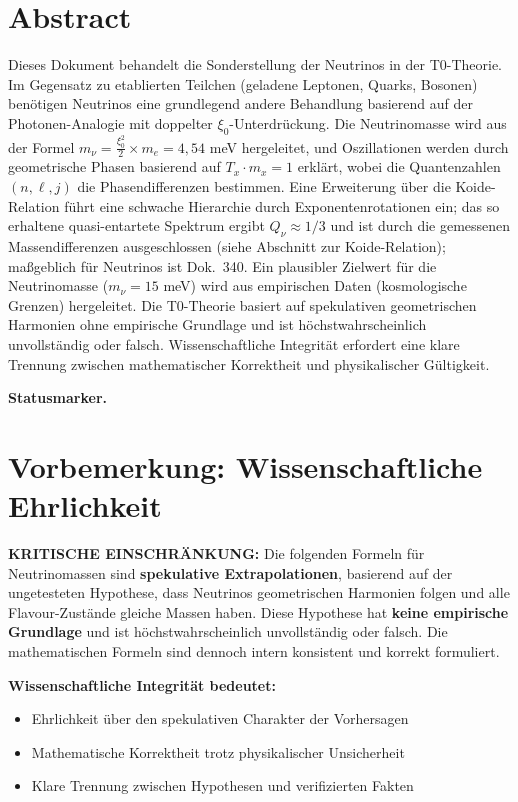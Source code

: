 \section*{Abstract}
		Dieses Dokument behandelt die Sonderstellung der Neutrinos in der T0-Theorie. Im Gegensatz zu etablierten Teilchen (geladene Leptonen, Quarks, Bosonen) benötigen Neutrinos eine grundlegend andere Behandlung basierend auf der Photonen-Analogie mit doppelter $\xi_0$-Unterdrückung. Die Neutrinomasse wird aus der Formel $m_\nu = \frac{\xi_0^2}{2} \times m_e = 4,54$ meV hergeleitet, und Oszillationen werden durch geometrische Phasen basierend auf $T_x \cdot m_x = 1$ erklärt, wobei die Quantenzahlen $(n, \ell, j)$ die Phasendifferenzen bestimmen. Eine Erweiterung über die Koide-Relation führt eine schwache Hierarchie durch Exponentenrotationen ein; das so erhaltene quasi-entartete Spektrum ergibt $Q_\nu \approx 1/3$ und ist durch die gemessenen Massendifferenzen ausgeschlossen (siehe Abschnitt zur Koide-Relation); maßgeblich für Neutrinos ist Dok.~340. Ein plausibler Zielwert für die Neutrinomasse ($m_\nu = 15$ meV) wird aus empirischen Daten (kosmologische Grenzen) hergeleitet. Die T0-Theorie basiert auf spekulativen geometrischen Harmonien ohne empirische Grundlage und ist höchstwahrscheinlich unvollständig oder falsch. Wissenschaftliche Integrität erfordert eine klare Trennung zwischen mathematischer Korrektheit und physikalischer Gültigkeit.

	
	
\medskip\noindent\textbf{Statusmarker.}


	\section{Vorbemerkung: Wissenschaftliche Ehrlichkeit}
	
	\begin{warning}
		\textbf{KRITISCHE EINSCHRÄNKUNG:} Die folgenden Formeln für Neutrinomassen sind \textbf{spekulative Extrapolationen}, basierend auf der ungetesteten Hypothese, dass Neutrinos geometrischen Harmonien folgen und alle Flavour-Zustände gleiche Massen haben. Diese Hypothese hat \textbf{keine empirische Grundlage} und ist höchstwahrscheinlich unvollständig oder falsch. Die mathematischen Formeln sind dennoch intern konsistent und korrekt formuliert.
		
		\vspace{0.5cm}
		\textbf{Wissenschaftliche Integrität bedeutet:}
		\begin{itemize}
			\item Ehrlichkeit über den spekulativen Charakter der Vorhersagen
			\item Mathematische Korrektheit trotz physikalischer Unsicherheit
			\item Klare Trennung zwischen Hypothesen und verifizierten Fakten
		\end{itemize}
	\end{warning}
	
